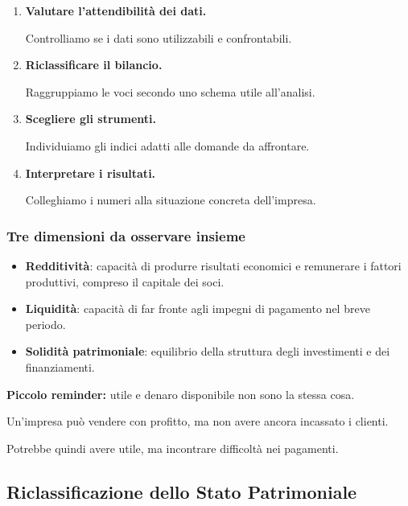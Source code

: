 \begin{enumerate}
    \item \textbf{Valutare l'attendibilità dei dati.}

    Controlliamo se i dati
    sono utilizzabili e confrontabili.

    \item \textbf{Riclassificare il bilancio.}

    Raggruppiamo le voci
    secondo uno schema utile all'analisi.

    \item \textbf{Scegliere gli strumenti.}

    Individuiamo gli indici
    adatti alle domande da affrontare.

    \item \textbf{Interpretare i risultati.}

    Colleghiamo i numeri
    alla situazione concreta dell'impresa.
\end{enumerate}


\subsubsection*{Tre dimensioni da osservare insieme}

\begin{itemize}
    \item \textbf{Redditività}:
    capacità di produrre risultati economici
    e remunerare i fattori produttivi,
    compreso il capitale dei soci.

    \item \textbf{Liquidità}:
    capacità di far fronte
    agli impegni di pagamento
    nel breve periodo.

    \item \textbf{Solidità patrimoniale}:
    equilibrio della struttura
    degli investimenti e dei finanziamenti.
\end{itemize}

\noindent \textbf{Piccolo reminder:}
utile e denaro disponibile
non sono la stessa cosa.

\noindent Un'impresa può vendere con profitto,
ma non avere ancora incassato i clienti.

\noindent Potrebbe quindi avere utile,
ma incontrare difficoltà nei pagamenti.


\subsection{Riclassificazione dello Stato Patrimoniale}

